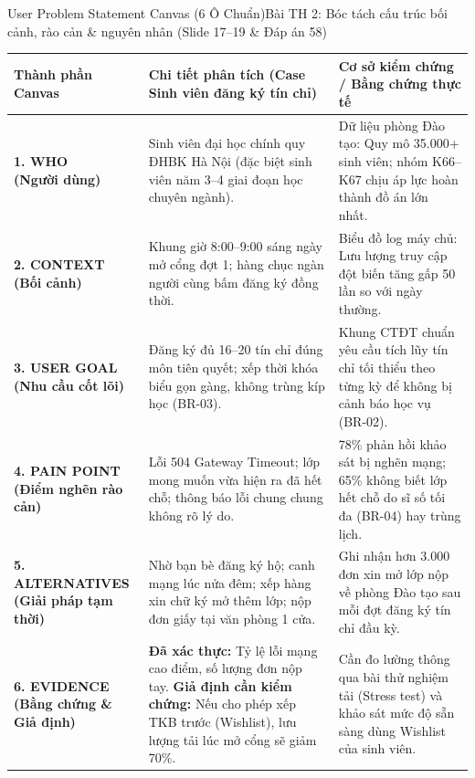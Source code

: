 \documentclass[aspectratio=169, 10pt]{beamer}
\begin{document}
\begin{frame}[t]{User Problem Statement Canvas (6 Ô Chuẩn)}{Bài TH 2: Bóc tách cấu trúc bối cảnh, rào cản \& nguyên nhân (Slide 17--19 \& Đáp án 58)}
  \vspace{-0.15cm}
  \tiny
  \begin{tabularx}{\linewidth}{@{}P{2.2cm}|Y|Y@{}}
    \toprule
    \textbf{Thành phần Canvas} & \textbf{Chi tiết phân tích (Case Sinh viên đăng ký tín chỉ)} & \textbf{Cơ sở kiểm chứng / Bằng chứng thực tế} \\
    \midrule
    \textbf{1. WHO\newline(Người dùng)} & 
    Sinh viên đại học chính quy ĐHBK Hà Nội (đặc biệt sinh viên năm 3--4 giai đoạn học chuyên ngành). & 
    Dữ liệu phòng Đào tạo: Quy mô 35.000+ sinh viên; nhóm K66--K67 chịu áp lực hoàn thành đồ án lớn nhất. \\
    \midrule
    \textbf{2. CONTEXT\newline(Bối cảnh)} & 
    Khung giờ 8:00--9:00 sáng ngày mở cổng đợt 1; hàng chục ngàn người cùng bấm đăng ký đồng thời. & 
    Biểu đồ log máy chủ: Lưu lượng truy cập đột biến tăng gấp 50 lần so với ngày thường. \\
    \midrule
    \textbf{3. USER GOAL\newline(Nhu cầu cốt lõi)} & 
    Đăng ký đủ 16--20 tín chỉ đúng môn tiên quyết; xếp thời khóa biểu gọn gàng, không trùng kíp học (BR-03). & 
    Khung CTĐT chuẩn yêu cầu tích lũy tín chỉ tối thiểu theo từng kỳ để không bị cảnh báo học vụ (BR-02). \\
    \midrule
    \textbf{4. PAIN POINT\newline(Điểm nghẽn rào cản)} & 
    Lỗi 504 Gateway Timeout; lớp mong muốn vừa hiện ra đã hết chỗ; thông báo lỗi chung chung không rõ lý do. & 
    78\% phản hồi khảo sát bị nghẽn mạng; 65\% không biết lớp hết chỗ do sĩ số tối đa (BR-04) hay trùng lịch. \\
    \midrule
    \textbf{5. ALTERNATIVES\newline(Giải pháp tạm thời)} & 
    Nhờ bạn bè đăng ký hộ; canh mạng lúc nửa đêm; xếp hàng xin chữ ký mở thêm lớp; nộp đơn giấy tại văn phòng 1 cửa. & 
    Ghi nhận hơn 3.000 đơn xin mở lớp nộp về phòng Đào tạo sau mỗi đợt đăng ký tín chỉ đầu kỳ. \\
    \midrule
    \textbf{6. EVIDENCE\newline(Bằng chứng \& Giả định)} & 
    \textbf{Đã xác thực:} Tỷ lệ lỗi mạng cao điểm, số lượng đơn nộp tay.\newline
    \textbf{Giả định cần kiểm chứng:} Nếu cho phép xếp TKB trước (Wishlist), lưu lượng tải lúc mở cổng sẽ giảm 70\%. & 
    Cần đo lường thông qua bài thử nghiệm tải (Stress test) và khảo sát mức độ sẵn sàng dùng Wishlist của sinh viên. \\
    \bottomrule
  \end{tabularx}
\end{frame}
\end{document}
